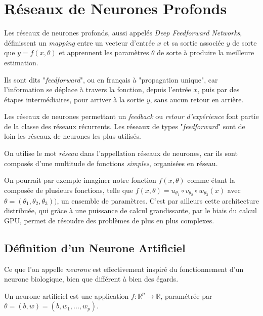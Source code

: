 \documentclass[a4paper, 11pt]{report}
\begin{document}
\section{Réseaux de Neurones Profonds}
Les réseaux de neurones profonds, aussi appelés \emph{Deep Feedforward Networks}, définissent un \emph{mapping} entre un vecteur d'entrée $x$ et sa sortie associée $y$ de sorte que $y = f(x,\theta)$ et apprennent les paramètres $\theta$ de sorte à produire la meilleure estimation.

Ils sont dits "\emph{feedforward}", ou en français à "propagation unique", car l'information se déplace à travers la fonction, depuis l'entrée $x$, puis par des étapes intermédiaires, pour arriver à la sortie $y$, sans aucun retour en arrière.

Les réseaux de neurones permettant un \emph{feedback} ou \emph{retour d'expérience} font partie de la classe des réseaux récurrents.
Les réseaux de types "\emph{feedforward}" sont de loin les réseaux de neurones les plus utilisés.

On utilise le mot \emph{réseau} dans l’appellation réseaux de neurones, car ils sont composés d'une multitude de fonctions \emph{simples}, organisées en réseau.

On pourrait par exemple imaginer notre fonction $f(x,\theta)$ comme étant la composée de plusieurs fonctions, telle que $f(x,\theta) = u_{\theta_1} \circ v_{\theta_2} \circ w_{\theta_3}(x)$ avec $\theta = (\theta_1,\theta_2, \theta_3))$, un ensemble de paramètres.
C'est par ailleurs cette architecture distribuée, qui grâce à une puissance de calcul grandissante, par le biais du calcul GPU, permet de résoudre des problèmes de plus en plus complexes.
\subsection{Définition d'un Neurone Artificiel}
Ce que l'on appelle \emph{neurone} est effectivement inspiré du fonctionnement d'un neurone biologique, bien que différent à bien des égards.

Un neurone artificiel est une application $f : \mathbb{R}^p \rightarrow \mathbb{R}$, paramétrée par $\theta = (b,w) = (b, w_1, ..., w_p)$.
\end{document}
